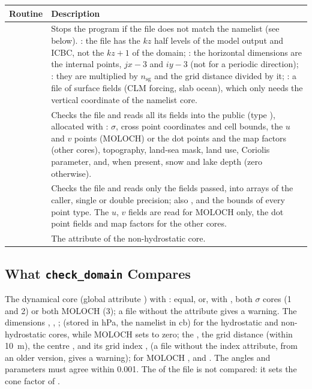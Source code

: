 \begin{longtable}{L{5cm} L{9cm}}
  \toprule
  \textbf{Routine} & \textbf{Description} \\
  \midrule
  \endhead
  \bottomrule
  \endfoot
   &
    Stops the program if the file does not match the namelist (see
    below). : the file has the $kz$ half levels of the model
    output and ICBC, not the $kz+1$ of the domain; : the
    horizontal dimensions are the internal points, $jx-3$ and $iy-3$ (not
    for a periodic direction); : they are multiplied by
    $n_\text{sg}$ and the grid distance divided by it; :
    a file of surface fields (CLM forcing, slab ocean), which only needs
    the vertical coordinate of the namelist core. \\
   &
    Checks the file and reads all its fields into the public
     (type ), allocated with
    : $\sigma$, cross point coordinates and cell bounds,
    the $u$ and $v$ points (MOLOCH) or the dot points and the map factors
    (other cores), topography, land-sea mask, land use, Coriolis
    parameter, and, when present, snow and lake depth (zero otherwise). \\
   &
    Checks the file and reads only the fields passed, into arrays of the
    caller, single or double precision; also , 
    and the bounds of every point type. The $u$, $v$ fields are read for
    MOLOCH only, the dot point fields and map factors for the other
    cores. \\
   &
    The  attribute of the
    non-hydrostatic core. \\
\end{longtable}

\subsection{What \texttt{check\_domain} Compares}

The dynamical core (global attribute ) with
: equal, or, with , both $\sigma$ cores (1
and 2) or both MOLOCH (3); a file without the attribute gives a warning.
The dimensions , , ;  (stored in
hPa, the namelist in cb) for the hydrostatic and non-hydrostatic cores,
while MOLOCH sets  to zero; the , the grid
distance (within 10~m), the centre ,  and its grid
index ,  (a file without the index attribute, from
an older version, gives a warning); for MOLOCH ,
 and . The angles and parameters must agree within
0.001. The  of the file is not compared: it sets the
cone factor  of .

